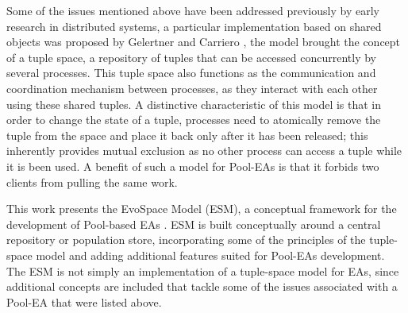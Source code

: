 Some of the issues mentioned above have been addressed previously by early research in distributed systems, a particular implementation based on shared objects was proposed by Gelertner and Carriero \cite{linda}, the model brought the concept of a tuple space, a repository of tuples that can be accessed concurrently by several processes. This tuple space also functions as the communication and coordination mechanism  between processes, as they interact with each other using these shared tuples. A distinctive characteristic of this model is that in order to change the state of a tuple, processes need to atomically remove the tuple from the space and place it back only after it has been released; this inherently provides mutual exclusion as no other process can access a tuple while it is been used. A benefit of such a model for Pool-EAs is that it forbids two clients from pulling the same work. 

This work presents the EvoSpace Model (ESM), a conceptual framework for the development of Pool-based EAs \cite{Evospace}. ESM is built conceptually around a central repository or population store, incorporating some of the principles of the tuple-space model and adding additional features suited for Pool-EAs development. The ESM is not simply an implementation of a tuple-space model for EAs, since additional concepts are included that tackle some of the issues associated with a Pool-EA that were listed above.

